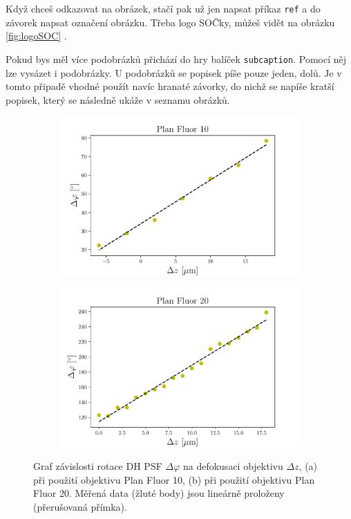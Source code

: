 \documentclass[12pt, a4paper,
 twoside,        %
 openright
]{report}
\begin{document}
Když chceš odkazovat na obrázek, stačí pak už jen napsat příkaz \texttt{ref} a do závorek napsat označení obrázku. Třeba logo SOČky, můžeš vidět na obrázku \ref{fig:logoSOC} \cite{socLogo}.

Pokud bys měl více podobrázků přichází do hry balíček \texttt{subcaption}. Pomocí něj lze vysázet i podobrázky. U podobrázků se popisek píše pouze jeden, dolů. Je v tomto připadě vhodné použít navíc hranaté závorky, do nichž se napíše kratší popisek, který se následně ukáže v seznamu obrázků.


\begin{figure}[h] \centering
    \begin{subfigure}{0.63\textwidth} %
      \includegraphics[width=\textwidth]{imgs/vysledek_10} 
      \caption{} %
    \end{subfigure}
    \begin{subfigure}{0.63\textwidth}
      \includegraphics[width=\textwidth]{imgs/vysledek_20}
      \caption{}
    \end{subfigure}
    \caption[Graf závislosti rotace DH PSF $\Delta\varphi$ na defokusaci objektivu $\Delta z$.]{Graf závislosti rotace DH PSF $\Delta\varphi$ na defokusaci objektivu $\Delta z$, (a) při použití objektivu Plan Fluor 10, (b) při použití objektivu Plan Fluor 20. Měřená data (žluté body) jsou lineárně proloženy (přerušovaná přímka). }
    \label{fig:rotace_grafy}
\end{figure}
\end{document}
